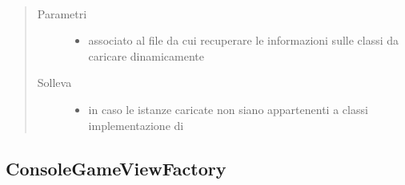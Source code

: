 \documentclass[letterpaper,10pt,italian,openany,oneside]{sphinxmanual}
\begin{document}
\begin{fulllineitems}
\label{\detokenize{test/it/unicam/cs/pa/mastermind/factories/BreakerFactoryRegistry:it.unicam.cs.pa.mastermind.factories.BreakerFactoryRegistry.BreakerFactoryRegistry(String)}}~\begin{quote}\begin{description}
\item[{Parametri}] \leavevmode\begin{itemize}
\item {} 
 \textendash{} associato al file da cui recuperare le informazioni sulle classi da caricare dinamicamente

\end{itemize}

\item[{Solleva}] \leavevmode\begin{itemize}
\item {} 
 \textendash{} in caso le istanze caricate non siano appartenenti a classi implementazione di 

\end{itemize}

\end{description}\end{quote}

\end{fulllineitems}



\subsection{ConsoleGameViewFactory}
\label{\detokenize{test/it/unicam/cs/pa/mastermind/factories/ConsoleGameViewFactory:consolegameviewfactory}}\label{\detokenize{test/it/unicam/cs/pa/mastermind/factories/ConsoleGameViewFactory::doc}}
\end{document}
